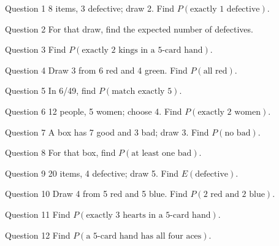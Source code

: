 \documentclass[11pt]{article}
\begin{document}
\begin{qbox}{Question 1}
8 items, 3 defective; draw 2. Find $P(\text{exactly 1 defective})$.\workspace{2.4cm}
\end{qbox}

\begin{qbox}{Question 2}
For that draw, find the expected number of defectives.\workspace{2.4cm}
\end{qbox}

\begin{qbox}{Question 3}
Find $P(\text{exactly 2 kings in a 5-card hand})$.\workspace{2.4cm}
\end{qbox}

\begin{qbox}{Question 4}
Draw 3 from 6 red and 4 green. Find $P(\text{all red})$.\workspace{2.4cm}
\end{qbox}

\begin{qbox}{Question 5}
In 6/49, find $P(\text{match exactly 5})$.\workspace{2.4cm}
\end{qbox}

\begin{qbox}{Question 6}
12 people, 5 women; choose 4. Find $P(\text{exactly 2 women})$.\workspace{2.4cm}
\end{qbox}

\begin{qbox}{Question 7}
A box has 7 good and 3 bad; draw 3. Find $P(\text{no bad})$.\workspace{2.4cm}
\end{qbox}

\begin{qbox}{Question 8}
For that box, find $P(\text{at least one bad})$.\workspace{2.4cm}
\end{qbox}

\begin{qbox}{Question 9}
20 items, 4 defective; draw 5. Find $E(\text{defective})$.\workspace{2.4cm}
\end{qbox}

\begin{qbox}{Question 10}
Draw 4 from 5 red and 5 blue. Find $P(\text{2 red and 2 blue})$.\workspace{2.4cm}
\end{qbox}

\begin{qbox}{Question 11}
Find $P(\text{exactly 3 hearts in a 5-card hand})$.\workspace{2.4cm}
\end{qbox}

\begin{qbox}{Question 12}
Find $P(\text{a 5-card hand has all four aces})$.\workspace{2.4cm}
\end{qbox}
\end{document}
